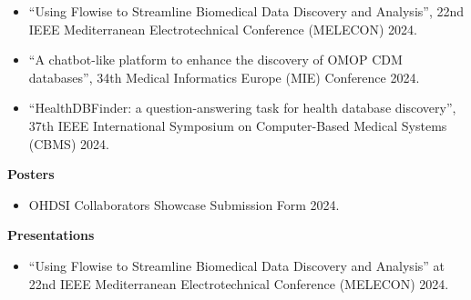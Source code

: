 \begin{itemize}
    \item ``Using Flowise to Streamline Biomedical Data Discovery and Analysis''\cite{reis2024flowise}, 22nd IEEE Mediterranean Electrotechnical Conference (MELECON) 2024.
    \item ``A chatbot-like platform to enhance the discovery of OMOP CDM databases''\cite{reis2024chatbotlike}, 34th Medical Informatics Europe (MIE) Conference 2024.
    \item ``HealthDBFinder: a question-answering task for health database discovery''\cite{almeida2024healthdbfinder}, 37th IEEE International Symposium on Computer-Based Medical Systems (CBMS) 2024.
\end{itemize}


\noindent \textbf{Posters}

\begin{itemize}
    \item OHDSI Collaborators Showcase Submission Form 2024.
\end{itemize}


\noindent \textbf{Presentations}

\begin{itemize}
    \item ``Using Flowise to Streamline Biomedical Data Discovery and Analysis''\cite{reis2024flowise} at 22nd IEEE Mediterranean Electrotechnical Conference (MELECON) 2024.
\end{itemize}